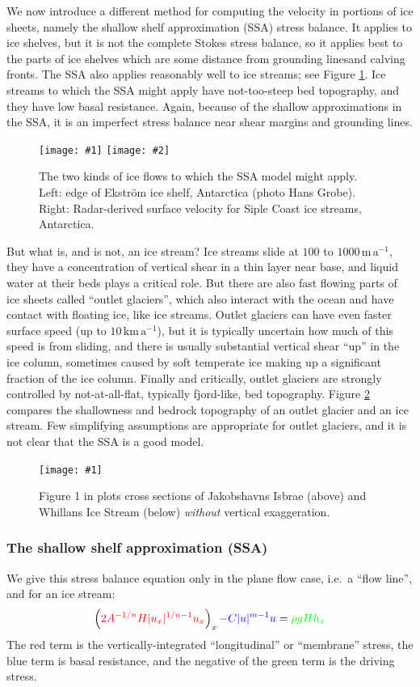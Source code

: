 \documentclass[titlepage,letterpaper,final,12pt]{scrartcl}
\newcommand{\onefigsize}[3]{
\begin{figure}[ht]
\centering
\texttt{[image: \#1]}
\caption{#2}
\label{fig:#1}
\end{figure}}
\newcommand{\onefig}[2]{\onefigsize{#1}{#2}{3.0in}}
\newcommand{\twofigsizes}[5]{
\begin{figure}[ht]
\centering
\texttt{[image: \#1]} \quad
\texttt{[image: \#2]}
\caption{#3}
\label{fig:#1}
\end{figure}}
\begin{document}
We now introduce a different method for computing the velocity in portions of ice sheets, namely the shallow shelf approximation (SSA) stress balance.  It applies to ice shelves, but it is not the complete Stokes stress balance, so it applies best to the parts of ice shelves which are some distance from grounding linesand calving fronts.  The SSA also applies reasonably well to ice streams; see Figure \ref{fig:iceshelfedge}.  Ice streams to which the SSA might apply have not-too-steep bed topography, and they have low basal resistance.  Again, because of the shallow approximations in the SSA, it is an imperfect stress balance near shear margins and grounding lines.

\twofigsizes{iceshelfedge}{siple}{The two kinds of ice flows to which the SSA model might apply.  Left: edge of Ekstr\"om ice shelf, Antarctica (photo Hans Grobe).  Right: Radar-derived surface velocity for Siple Coast ice streams, Antarctica.}{3.0in}{2.6in}

But what is, and is not, an ice stream?  Ice streams slide at $100$ to $1000 \,\text{m}\,\text{a}^{-1}$, they have a concentration of vertical shear in a thin layer near base, and liquid water at their beds plays a critical role.  But there are also fast flowing parts of ice sheets called ``outlet glaciers'', which also interact with the ocean and have contact with floating ice, like ice streams.  Outlet glaciers can have even faster surface speed (up to $10 \,\text{km}\,\text{a}^{-1}$), but it is typically uncertain how much of this speed is from sliding, and there is usually substantial vertical shear ``up'' in the ice column, sometimes caused by soft temperate ice making up a significant fraction of the ice column.  Finally and critically, outlet glaciers are strongly controlled by not-at-all-flat, typically fjord-like, bed topography.  Figure \ref{fig:streamisbrae} compares the shallowness and bedrock topography of an outlet glacier and an ice stream.  Few simplifying assumptions are appropriate for outlet glaciers, and it is not clear that the SSA is a good model.

\onefig{streamisbrae}{Figure 1 in \cite{TrufferEchelmeyer} plots cross sections of Jakobshavns Isbrae (above) and Whillans Ice Stream (below) \emph{without} vertical exaggeration.}

\subsubsection*{The shallow shelf approximation (SSA)}  We give this stress balance equation only in the plane flow case, i.e.~a ``flow line'', and for an ice stream:
\begin{equation}
  \left({\color{red}2 A^{-1/n} H |u_x|^{1/n - 1} u_x}\right)_x {\color{blue} - C|u|^{m-1}u} = {\color{green}\rho g H h_x} \label{ssa}
\end{equation}
The {\color{red} red term} is the vertically-integrated ``longitudinal'' or ``membrane'' stress, the {\color{blue} blue term} is basal resistance, and the negative of the {\color{green} green term} is the driving stress.
\end{document}

